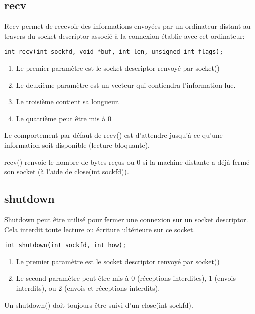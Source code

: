 \documentclass[a4paper]{article}
\begin{document}
\subsection{recv}
Recv permet de recevoir des informations envoyées par un ordinateur distant au travers du socket descriptor associé à la connexion établie avec cet ordinateur:
\begin{lstlisting}
int recv(int sockfd, void *buf, int len, unsigned int flags);
\end{lstlisting}
\begin{enumerate}
  \item Le premier paramètre est le socket descriptor renvoyé par socket()
  \item Le deuxième paramètre est un vecteur qui contiendra l'information lue.
  \item Le troisième contient sa longueur.
  \item Le quatrième peut être mis à 0 
\end{enumerate}
Le comportement par défaut de recv() est d'attendre jusqu'à ce qu'une information soit disponible (lecture bloquante).\par
recv() renvoie le nombre de bytes reçus ou 0 si la machine distante a déjà fermé son socket (à l'aide de close(int sockfd)).
\subsection{shutdown}
Shutdown peut être utilisé pour fermer une connexion sur un socket descriptor. Cela interdit toute lecture ou écriture ultérieure sur ce socket.
\begin{lstlisting}
int shutdown(int sockfd, int how);
\end{lstlisting}
\begin{enumerate}
  \item Le premier paramètre est le socket descriptor renvoyé par socket()
  \item Le second paramètre peut être mis à 0 (réceptions interdites), 1 (envois interdits), ou 2 (envois et réceptions interdits).
\end{enumerate}
Un shutdown() doit toujours être suivi d'un close(int sockfd).
\end{document}
